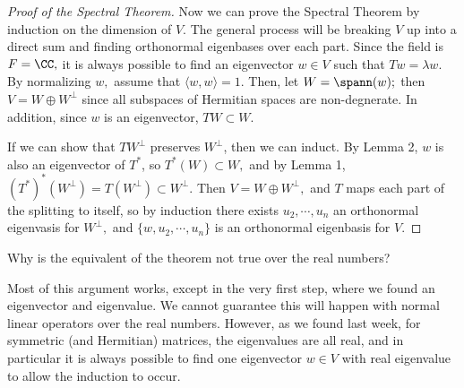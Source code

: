 \begin{proof}[Proof of the Spectral Theorem]
Now we can prove the Spectral Theorem by induction on the dimension of $V.$ The general process will be breaking $V$ up into a direct sum and finding orthonormal eigenbases over each part.
Since the field is $F = \CC,$ it is always possible to find an eigenvector $w \in V$ such that $Tw = \lambda w.$ By normalizing $w,$ assume that $\langle w, w \rangle = 1.$ Then, let $W = \spann(w);$ then $V = W \oplus W^\perp$ since all subspaces of Hermitian spaces are non-degnerate. In addition, since $w$ is an eigenvector, $TW \subset W.$ 

If we can show that $TW^\perp$ preserves $W^\perp$, then we can induct.
By Lemma 2, $w$ is also an eigenvector of $T^*$, so $T^*(W) \subset W,$ and by Lemma 1, $(T^*)^*(W^\perp) = T(W^\perp) \subset W^\perp.$ Then $V = W \oplus W^\perp,$ and $T$ maps each part of the splitting to itself, so by induction there exists $u_2, \cdots, u_n$ an orthonormal eigenvasis for $W^\perp,$ and $\{w, u_2, \cdots, u_n\}$ is an orthonormal eigenbasis for $V.$ 
\end{proof}

\begin{question}
Why is the equivalent of the theorem not true over the real numbers? 
\end{question}
\begin{ans}
Most of this argument works, except in the very first step, where we found an eigenvector and eigenvalue. We cannot guarantee this will happen with normal linear operators over the real numbers. However, as we found last week, for symmetric (and Hermitian) matrices, the eigenvalues are all real, and in particular it is always possible to find one eigenvector $w \in V$ with real eigenvalue to allow the induction to occur.
\end{ans}


